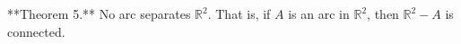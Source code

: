 **Theorem 5.** No arc separates $\mathbb{R}^2$. That is, if $A$ is an arc in $\mathbb{R}^2$, then $\mathbb{R}^2 - A$ is connected.
